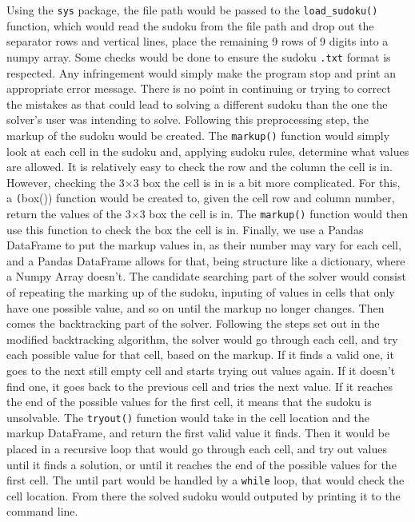 \documentclass[12pt]{report} %
\begin{document}
\vspace*{1\baselineskip}
Using the \texttt{sys} package, the file path would be passed to the \texttt{load\_sudoku()} function, which would read the sudoku from the file path and drop out the separator rows and vertical lines, place the remaining 9 rows of 9 digits into a numpy array. Some checks would be done to ensure the sudoku \texttt{.txt} format is respected. Any infringement would simply make the program stop and print an appropriate error message. There is no point in continuing or trying to correct the mistakes as that could lead to solving a different sudoku than the one the solver's user was intending to solve.
Following this preprocessing step, the markup of the sudoku would be created. The \texttt{markup()} function would simply look at each cell in the sudoku and, applying sudoku rules, determine what values are allowed. It is relatively easy to check the row and the column the cell is in. However, checking the 3$\times$3 box the cell is in is a bit more complicated. For this, a \texttt(box()) function would be created to, given the cell row and column number, return the values of the 3$\times$3 box the cell is in. The \texttt{markup()} function would then use this function to check the box the cell is in. Finally, we use a Pandas DataFrame to put the markup values in, as their number may vary for each cell, and a Pandas DataFrame allows for that, being structure like a dictionary, where a Numpy Array doesn't.
The candidate searching part of the solver would consist of repeating the marking up of the sudoku, inputing of values in cells that only have one possible value, and so on until the markup no longer changes.
Then comes the backtracking part of the solver. Following the steps set out in the modified backtracking algorithm, the solver would go through each cell, and try each possible value for that cell, based on the markup. If it finds a valid one, it goes to the next still empty cell and starts trying out values again. If it doesn't find one, it goes back to the previous cell and tries the next value. If it reaches the end of the possible values for the first cell, it means that the sudoku is unsolvable. The \texttt{tryout()} function would take in the cell location and the markup DataFrame, and return the first valid value it finds. Then it would be placed in a recursive loop that would go through each cell, and try out values until it finds a solution, or until it reaches the end of the possible values for the first cell. The until part would be handled by a \texttt{while} loop, that would check the cell location.
From there the solved sudoku would outputed by printing it to the command line.
\end{document}
